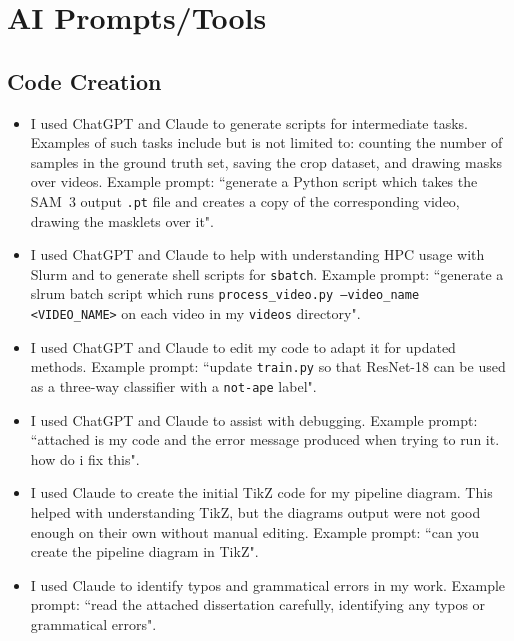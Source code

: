 \documentclass[author={Jacob Stephenson},
    degree={BSc},
    title={Robust Great Ape Species Detection in Wild Camera Trap Imagery with Promptable Concept Segmentation},
    unit={COMS30045},
    subtitle={}]{dissertation}
\begin{document}
\backmatter





\appendix

\chapter{AI Prompts/Tools}
\label{appx:ai}

\section{Code Creation}

\begin{itemize}
    \item I used ChatGPT and Claude to generate scripts for intermediate tasks. Examples of such tasks include but is not limited to: counting the number of samples in the ground truth set, saving the crop dataset, and drawing masks over videos. Example prompt: ``generate a Python script which takes the SAM~3 output \texttt{.pt} file and creates a copy of the corresponding video, drawing the masklets over it".
    \item I used ChatGPT and Claude to help with understanding HPC usage with Slurm and to generate shell scripts for \texttt{sbatch}. Example prompt: ``generate a slrum batch script which runs \texttt{process\_video.py --video\_name <VIDEO\_NAME>} on each video in my \texttt{videos} directory".
    \item I used ChatGPT and Claude to edit my code to adapt it for updated methods. Example prompt: ``update \texttt{train.py} so that ResNet-18 can be used as a three-way classifier with a \texttt{not-ape} label".
    \item I used ChatGPT and Claude to assist with debugging. Example prompt: ``attached is my code and the error message produced when trying to run it. how do i fix this".
    \item I used Claude to create the initial TikZ code for my pipeline diagram. This helped with understanding TikZ, but the diagrams output were not good enough on their own without manual editing. Example prompt: ``can you create the pipeline diagram in TikZ".
    \item I used Claude to identify typos and grammatical errors in my work. Example prompt: ``read the attached dissertation carefully, identifying any typos or grammatical errors".

\end{itemize}
\end{document}
